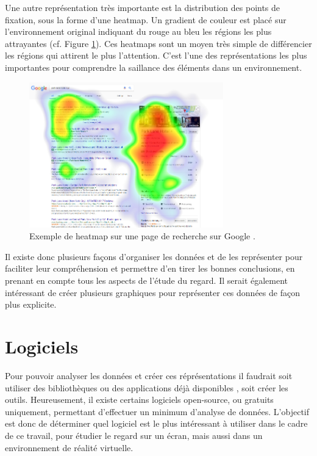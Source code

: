 \documentclass[12pt]{article}
\begin{document}
Une autre représentation très importante est la distribution des points de
fixation, sous la forme d'une heatmap. Un gradient de couleur est placé sur
l'environnement original indiquant du rouge au bleu les régions les plus
attrayantes (cf. Figure \ref{fig:heatmap}). Ces heatmaps sont un moyen très
simple de différencier les régions qui attirent le plus l'attention. C'est
l'une des représentations les plus importantes pour comprendre la saillance des
éléments dans un environnement.

\begin{figure}[ht]
  \centering
  \includegraphics[width=0.75\textwidth,keepaspectratio=true]{heatmap.png}
  \caption{Exemple de heatmap sur une page de recherche sur Google
    \cite{img:heatmap}.}
  \label{fig:heatmap}
\end{figure}

\bigskip
Il existe donc plusieurs façons d'organiser les données et de les représenter
pour faciliter leur compréhension et permettre d'en tirer les bonnes
conclusions, en prenant en compte tous les aspects de l'étude du regard. Il
serait également intéressant de créer plusieurs graphiques pour représenter ces
données de façon plus explicite.


\section{Logiciels}

Pour pouvoir analyser les données et créer ces réprésentations il faudrait soit
utiliser des bibliothèques ou des applications déjà disponibles
\cite{imotions:software}, soit créer les outils. Heureusement, il existe
certains logiciels open-source, ou gratuits uniquement, permettant d'effectuer
un minimum d'analyse de données. L'objectif est donc de déterminer quel
logiciel est le plus intéressant à utiliser dans le cadre de ce travail,
pour étudier le regard sur un écran, mais aussi dans un environnement de
réalité virtuelle.
\end{document}
